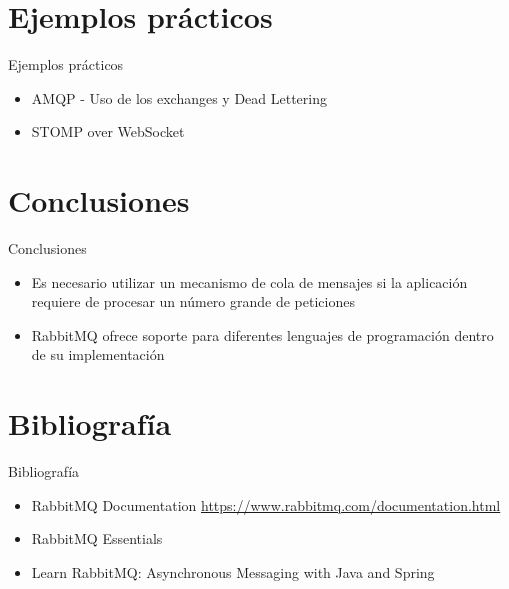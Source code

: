 \documentclass{beamer}
\begin{document}
  \section{Ejemplos prácticos}
  \begin{frame}{Ejemplos prácticos}
    \begin{itemize}
      \item AMQP - Uso de los exchanges y Dead Lettering
      \item STOMP over WebSocket
    \end{itemize}
  \end{frame}

  \section{Conclusiones}
  \begin{frame}{Conclusiones}
    \begin{itemize}
      \item Es necesario utilizar un mecanismo de cola de mensajes si
      la aplicación requiere de procesar un número grande de peticiones
      \item RabbitMQ ofrece soporte para diferentes lenguajes de programación
      dentro de su implementación
    \end{itemize}
  \end{frame}

  \section{Bibliografía}
  \begin{frame}{Bibliografía}
    \begin{itemize}
      \item RabbitMQ Documentation \url{https://www.rabbitmq.com/documentation.html}
      \item RabbitMQ Essentials
      \item Learn RabbitMQ: Asynchronous Messaging with Java and Spring
    \end{itemize}
  \end{frame}
\end{document}
